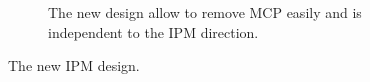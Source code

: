 \begin{figure}[!ht]
\begin{subfigure}[t]{0.75\textwidth}
		\caption{The new design allow to remove MCP easily and is independent to the IPM direction.}
		\label{}
	\end{subfigure}
	\caption[The new IPM design]{The new IPM design.}
	\label{chap5:fig:bride_double}
\end{figure}